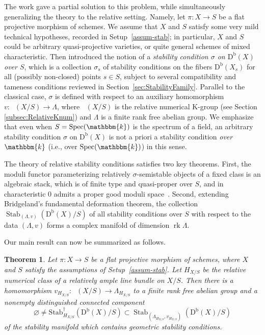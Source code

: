 \documentclass[11pt, reqno]{amsart}
\numberwithin{equation}{section}
\theoremstyle{plain}
\newtheorem{theorem}{Theorem}[section]
\theoremstyle{remark}
\theoremstyle{definition}
\theoremstyle{italicsname}
\newcommand{\Db}{\mathrm{D^b}}
\newcommand{\num}{\mathrm{num}}
\DeclareMathOperator{\Knum}{\rK_{\num}}
\DeclareMathOperator{\Stab}{Stab}
\newcommand{\Stabdagger}{\mathrm{Stab}^\dagger}
\DeclareMathOperator{\Spec}{Spec}
\DeclareMathOperator{\rk}{{rk}}
\newcommand{\rK}{\mathrm{K}}
\newcommand{\KK}{\mathbbm{k}}
\begin{document}
The work \cite{stability-families} gave a partial solution to this problem, 
while simultaneously generalizing the theory to the relative setting. 
Namely, let $\pi \colon X \to S$ be a flat projective morphism of schemes. 
We assume that $X$ and $S$ satisfy some very mild technical hypotheses, recorded in Setup~\ref{assum-stab}; in particular, $X$ and $S$ could be arbitrary quasi-projective varieties, or quite general schemes of mixed characteristic. 
Then \cite{stability-families} introduced the notion of a \emph{stability condition $\sigma$ on $\Db(X)$ over $S$}, 
which is a collection $\sigma_s$ of stability conditions on the fibers $\Db(X_s)$ for all (possibly non-closed) points $s \in S$, subject to several compatibility and tameness conditions reviewed in Section~\ref{sec:StabilityFamily}. 
Parallel to the classical case, $\sigma$ is defined with respect to an auxiliary homomorphism $v \colon \Knum(X/S) \to \Lambda$, where $\Knum(X/S)$ is the relative numerical K-group (see Section \ref{subsec:RelativeKnum}) and $\Lambda$ is a finite rank free abelian group. 
We emphasize that even when $S = \Spec(\KK)$ is the spectrum of a field, an arbitrary stability condition $\sigma$ on $\Db(X)$ is not a priori a stability condition \emph{over $\KK$} (i.e., over $\Spec(\KK)$) in this sense.

The theory of relative stability conditions satisfies two key theorems. 
First, the moduli functor parameterizing relatively $\sigma$-semistable objects of a fixed class is an algebraic stack, which is of finite type and quasi-proper over $S$, and in characteristic $0$ admits a proper good moduli space~\cite{AHLH}. 
Second, extending Bridgeland's fundamental deformation theorem, 
the collection $\Stab_{(\Lambda, v)}(\Db(X)/S)$ of all stability conditions over $S$ with respect to the data $(\Lambda, v)$ forms a complex manifold of dimension $\rk \Lambda$.  

Our main result can now be summarized as follows. 

\begin{theorem}
\label{main-theorem} 
Let $\pi \colon X \to S$ be a flat projective morphism of schemes, where $X$ and $S$ satisfy the assumptions of Setup~\ref{assum-stab}. 
Let $H_{X/S}$ be the relative numerical class of a relatively ample line bundle on $X/S$. 
Then there is a homomorphism $v_{H_{X/S}} \colon \Knum(X/S) \to \Lambda_{H_{X/S}}$ to a finite rank free abelian group and a nonempty distinguished connected component  
\begin{equation*}
\varnothing \neq \Stabdagger_{{H_{X/S}}}(\Db(X)/S) \subset \Stab_{\left(\Lambda_{H_{X/S}},v_{H_{X/S}}\right)}(\Db(X)/S)
\end{equation*}
of the stability manifold which contains geometric stability conditions. 
\end{theorem}
\end{document}
